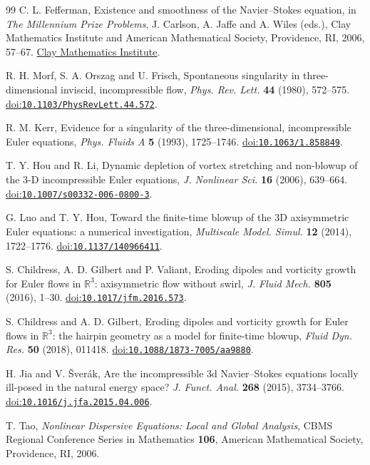 \begin{thebibliography}{99}
 C. L. Fefferman,
Existence and smoothness of the Navier--Stokes equation,
in \emph{The Millennium Prize Problems}, J. Carlson, A. Jaffe and
A. Wiles (eds.), Clay Mathematics Institute and American Mathematical
Society, Providence, RI, 2006, 57--67.
\href{https://www.claymath.org/wp-content/uploads/2022/06/navierstokes.pdf}{Clay Mathematics Institute}.

 R. H. Morf, S. A. Orszag and U. Frisch,
Spontaneous singularity in three-dimensional inviscid, incompressible flow,
\emph{Phys. Rev. Lett.} \textbf{44} (1980), 572--575.
\href{https://doi.org/10.1103/PhysRevLett.44.572}{doi:\nolinkurl{10.1103/PhysRevLett.44.572}}.

 R. M. Kerr,
Evidence for a singularity of the three-dimensional, incompressible Euler
equations, \emph{Phys. Fluids A} \textbf{5} (1993), 1725--1746.
\href{https://doi.org/10.1063/1.858849}{doi:\nolinkurl{10.1063/1.858849}}.

 T. Y. Hou and R. Li,
Dynamic depletion of vortex stretching and non-blowup of the 3-D
incompressible Euler equations,
\emph{J. Nonlinear Sci.} \textbf{16} (2006), 639--664.
\href{https://doi.org/10.1007/s00332-006-0800-3}{doi:\nolinkurl{10.1007/s00332-006-0800-3}}.

 G. Luo and T. Y. Hou,
Toward the finite-time blowup of the 3D axisymmetric Euler equations:
a numerical investigation,
\emph{Multiscale Model. Simul.} \textbf{12} (2014), 1722--1776.
\href{https://doi.org/10.1137/140966411}{doi:\nolinkurl{10.1137/140966411}}.

 S. Childress, A. D. Gilbert and P. Valiant,
Eroding dipoles and vorticity growth for Euler flows in $\mathbb R^3$:
axisymmetric flow without swirl,
\emph{J. Fluid Mech.} \textbf{805} (2016), 1--30.
\href{https://doi.org/10.1017/jfm.2016.573}{doi:\nolinkurl{10.1017/jfm.2016.573}}.

 S. Childress and A. D. Gilbert,
Eroding dipoles and vorticity growth for Euler flows in $\mathbb R^3$:
the hairpin geometry as a model for finite-time blowup,
\emph{Fluid Dyn. Res.} \textbf{50} (2018), 011418.
\href{https://doi.org/10.1088/1873-7005/aa9880}{doi:\nolinkurl{10.1088/1873-7005/aa9880}}.

 H. Jia and V. \v{S}ver\'ak,
Are the incompressible 3d Navier--Stokes equations locally ill-posed in
the natural energy space?
\emph{J. Funct. Anal.} \textbf{268} (2015), 3734--3766.
\href{https://doi.org/10.1016/j.jfa.2015.04.006}{doi:\nolinkurl{10.1016/j.jfa.2015.04.006}}.

 T. Tao,
\emph{Nonlinear Dispersive Equations: Local and Global Analysis},
CBMS Regional Conference Series in Mathematics \textbf{106},
American Mathematical Society, Providence, RI, 2006.
\end{thebibliography}
